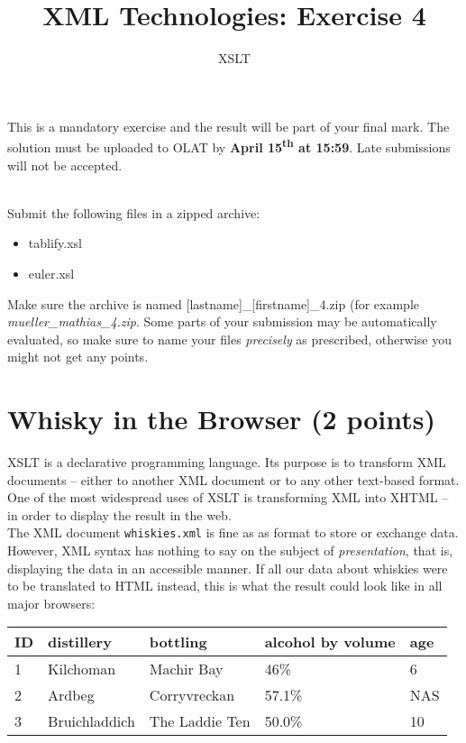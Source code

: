 \documentclass[a4paper, 12pt]{scrartcl}
\title{XML Technologies: Exercise 4}
\date{}
\subtitle{XSLT}
\begin{document}
\maketitle\vspace{-12ex}

\noindent This is a mandatory exercise and the result will be part of your final mark. The solution must be uploaded to OLAT by \textbf{April 15\textsuperscript{th} at 15:59}. Late submissions will not be accepted.\\\


\noindent Submit the following files in a zipped archive:
\begin{itemize}
\item tablify.xsl
\item euler.xsl
\end{itemize}

\noindent Make sure the archive is named [lastname]\_[firstname]\_4.zip (for example \textit{mueller\_mathias\_4.zip}. Some parts of your submission may be automatically evaluated, so make sure to name your files \textit{precisely} as prescribed, otherwise you might not get any points.



\section{Whisky in the Browser (2 points)}
\label{sec:xslt}

XSLT is a declarative programming language. Its purpose is to transform XML documents -- either to another XML document or to any other text-based format. One of the most widespread uses of XSLT is transforming XML into XHTML -- in order to display the result in the web. \\

\noindent The XML document \texttt{whiskies.xml} is fine as as format to store or exchange data. However, XML syntax has nothing to say on the subject of \textit{presentation}, that is, displaying the data in an accessible manner. If all our data about whiskies were to be translated to HTML instead, this is what the result could look like in all major browsers: \\

\begin{table}[h]
\centering
\label{my-label}
\begin{tabular}{|l|l|l|l|l|}
\hline
ID & distillery   & bottling &  alcohol by volume      & age \\ \hline
1  & Kilchoman   & Machir Bay  & 46\% & 6       \\ \hline
2  & Ardbeg   & Corryvreckan & 57.1\% & NAS         \\ \hline
3  & Bruichladdich & The Laddie Ten  & 50.0\% & 10  \\ \hline
\end{tabular}
\end{table}
\end{document}
